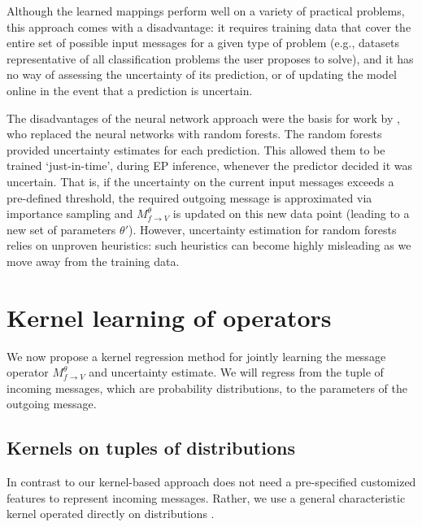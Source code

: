 \documentclass[english]{article}
\theoremstyle{plain}
\theoremstyle{plain}
\newcommand{\factor}{f}				%
\newcommand{\outV}{V}                         %
\newcommand{\approxMsg}[3]{M_{#1 \rightarrow #2}^{#3}}			%
\begin{document}
Although the learned mappings perform well on a variety of practical problems, 
this approach comes with a disadvantage: it requires training data
that cover the entire set of possible input messages for a given type of problem (e.g., datasets
representative of all classification problems the user proposes to solve),
and it has no way of assessing the uncertainty of its prediction, or of updating
the model online in the event that a prediction is uncertain.


The disadvantages of the neural network approach were the basis for work by
\citet{Eslami2014}, who replaced the neural networks with random forests.
The random forests  provided uncertainty estimates for each prediction. This
allowed them to be trained `just-in-time', during EP inference, whenever the
predictor decided it was uncertain. That is, if the uncertainty on the current
input messages exceeds a pre-defined threshold, the required outgoing message
is approximated via importance sampling  and
$\approxMsg{\factor}{\outV}{\theta}$ is updated on this new data point (leading
to a new set of parameters  $\theta'$). 
However, uncertainty estimation for random forests relies on unproven
heuristics: such heuristics can become highly misleading as we move away from
the training data.


\section{Kernel learning of operators}\label{sec:Online}

We now propose a kernel regression method for jointly learning the message operator $\approxMsg{\factor}{\outV}{\theta}$ and
uncertainty estimate. We will regress from the tuple of incoming messages, which
are probability distributions, to the parameters of the outgoing message. 

\subsection{Kernels on tuples of distributions}\label{sec:kernelsOnDistributions}

In contrast to \citet{Eslami2014,Heess2013} our kernel-based approach does not
need a pre-specified customized features to represent incoming messages.
Rather, we use a general characteristic kernel operated directly on distributions
\citep[eq.  9]{Christmann2010}.
\end{document}
